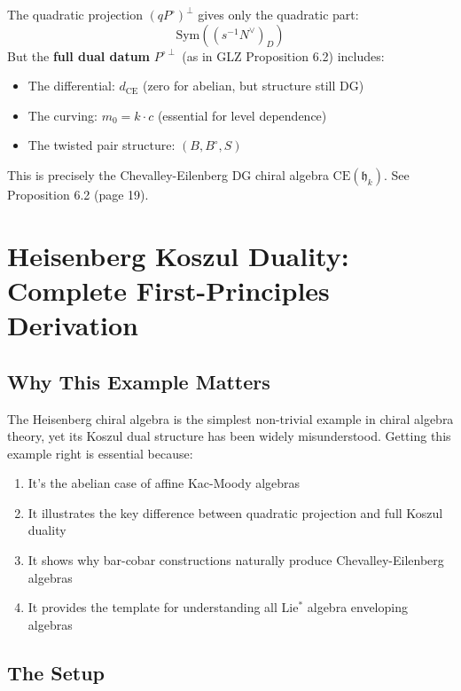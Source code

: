 \begin{example}
\begin{remark}
The quadratic projection $(qP^\circ)^\perp$ gives only the quadratic part:
$$\text{Sym}((s^{-1}N^\vee)_D)$$
But the \textbf{full dual datum} $P^{\circ\perp}$ (as in GLZ Proposition 6.2) includes:
\begin{itemize}
\item The differential: $d_{\text{CE}}$ (zero for abelian, but structure still DG)
\item The curving: $m_0 = k \cdot c$ (essential for level dependence)
\item The twisted pair structure: $(B, B^\circ, S)$
\end{itemize}
This is precisely the Chevalley-Eilenberg DG chiral algebra $\text{CE}(\mathfrak{h}_k)$.
See \cite{GLZ-2212.11252v1} Proposition 6.2 (page 19).
\end{remark}


\section{Heisenberg Koszul Duality: Complete First-Principles Derivation}
\label{sec:heisenberg-koszul-complete}

\subsection{Why This Example Matters}

The Heisenberg chiral algebra is the simplest non-trivial example in chiral algebra theory,
yet its Koszul dual structure has been widely misunderstood. Getting this example right is
essential because:
\begin{enumerate}
\item It's the abelian case of affine Kac-Moody algebras
\item It illustrates the key difference between quadratic projection and full Koszul duality
\item It shows why bar-cobar constructions naturally produce Chevalley-Eilenberg algebras
\item It provides the template for understanding all Lie$^*$ algebra enveloping algebras
\end{enumerate}

\subsection{The Setup}


\end{example}
